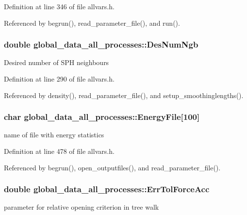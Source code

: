 Definition at line 346 of file allvars.h.



Referenced by begrun(), read\_\-parameter\_\-file(), and run().

\hypertarget{structglobal__data__all__processes_accb74aa1ccf3fb13e31f5704bb692313}{
\subsubsection[{DesNumNgb}]{\setlength{\rightskip}{0pt plus 5cm}double {\bf global\_\-data\_\-all\_\-processes::DesNumNgb}}}
\label{structglobal__data__all__processes_accb74aa1ccf3fb13e31f5704bb692313}
Desired number of SPH neighbours 

Definition at line 290 of file allvars.h.



Referenced by density(), read\_\-parameter\_\-file(), and setup\_\-smoothinglengths().

\hypertarget{structglobal__data__all__processes_aa97394ab3a522c46b75f8b57a59ca0b5}{
\subsubsection[{EnergyFile}]{\setlength{\rightskip}{0pt plus 5cm}char {\bf global\_\-data\_\-all\_\-processes::EnergyFile}\mbox{[}100\mbox{]}}}
\label{structglobal__data__all__processes_aa97394ab3a522c46b75f8b57a59ca0b5}
name of file with energy statistics 

Definition at line 478 of file allvars.h.



Referenced by begrun(), open\_\-outputfiles(), and read\_\-parameter\_\-file().

\hypertarget{structglobal__data__all__processes_a5a8eb914026679a7c816a09c20d25de0}{
\subsubsection[{ErrTolForceAcc}]{\setlength{\rightskip}{0pt plus 5cm}double {\bf global\_\-data\_\-all\_\-processes::ErrTolForceAcc}}}
\label{structglobal__data__all__processes_a5a8eb914026679a7c816a09c20d25de0}
parameter for relative opening criterion in tree walk 

